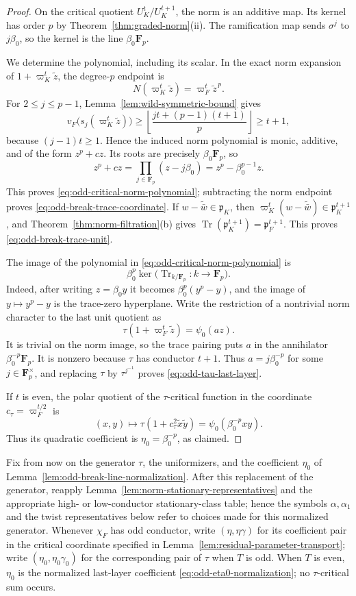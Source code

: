 \documentclass[11pt]{amsart}
\theoremstyle{definition}
\theoremstyle{remark}
\newcommand{\F}{\mathbf F}
\newcommand{\p}{\mathfrak p}
\newcommand{\Tr}{\operatorname{Tr}}
\begin{document}
\begin{proof}
On the critical quotient $U_K^t/U_K^{t+1}$, the norm is an additive
map.  Its kernel has order $p$ by
Theorem~\ref{thm:graded-norm}(ii).  The ramification map sends
$\sigma^j$ to $j\beta_0$, so the kernel is the line
$\beta_0\F_p$.

We determine the polynomial, including its scalar.  In the exact norm
expansion of $1+\varpi_K^t\widetilde z$, the degree-$p$ endpoint is
\[
 N(\varpi_K^t\widetilde z)=\varpi_F^t\widetilde z^{\,p}.
\]
For $2\le j\le p-1$, Lemma~\ref{lem:wild-symmetric-bound} gives
\[
 v_F\bigl(s_j(\varpi_K^t\widetilde z)\bigr)
 \ge
 \left\lfloor\frac{jt+(p-1)(t+1)}p\right\rfloor
 \ge t+1,
\]
because $(j-1)t\ge1$.  Hence the induced norm polynomial is monic,
additive, and of the form $z^p+cz$.  Its roots are precisely
$\beta_0\F_p$, so
\[
 z^p+cz=\prod_{j\in\F_p}(z-j\beta_0)
       =z^p-\beta_0^{p-1}z.
\]
This proves \eqref{eq:odd-critical-norm-polynomial}; subtracting the
norm endpoint proves \eqref{eq:odd-break-trace-coordinate}.
If $w-\widetilde{\bar w}\in\p_K$, then
$\varpi_K^t(w-\widetilde{\bar w})\in\p_K^{t+1}$, and
Theorem~\ref{thm:norm-filtration}(b) gives
$\Tr(\p_K^{t+1})=\p_F^{t+1}$.  This proves
\eqref{eq:odd-break-trace-unit}.

The image of the polynomial in
\eqref{eq:odd-critical-norm-polynomial} is
\[
 \beta_0^p\ker\bigl(\Tr_{k/\F_p}:k\to\F_p\bigr).
\]
Indeed, after writing $z=\beta_0y$ it becomes
$\beta_0^p(y^p-y)$, and the image of $y\mapsto y^p-y$ is the
trace-zero hyperplane.  Write the restriction of a nontrivial norm
character to the last unit quotient as
\[
 \tau(1+\varpi_F^t\widetilde z)=\psi_0(az).
\]
It is trivial on the norm image, so the trace pairing puts
$a$ in the annihilator
$\beta_0^{-p}\F_p$.  It is nonzero because $\tau$ has conductor
$t+1$.  Thus $a=j\beta_0^{-p}$ for some $j\in\F_p^\times$, and
replacing $\tau$ by $\tau^{j^{-1}}$ proves
\eqref{eq:odd-tau-last-layer}.

If $t$ is even, the polar quotient of the $\tau$-critical function in
the coordinate $c_\tau=\varpi_F^{t/2}$ is
\[
 (x,y)\longmapsto
 \tau(1+c_\tau^2\widetilde x\widetilde y)
 =\psi_0(\beta_0^{-p}xy).
\]
Thus its quadratic coefficient is $\eta_0=\beta_0^{-p}$, as claimed.
\end{proof}

Fix from now on the generator $\tau$, the uniformizers, and the
coefficient $\eta_0$ of Lemma~\ref{lem:odd-break-line-normalization}.
After this replacement of the generator, reapply
Lemma~\ref{lem:norm-stationary-representatives} and the appropriate
high- or low-conductor stationary-class table; hence the symbols
$\alpha,\alpha_1$ and the twist representatives below refer to choices
made for this normalized generator.  Whenever $\chi_F$ has odd
conductor, write
$(\eta,\eta\gamma)$ for its coefficient pair in the critical
coordinate specified in Lemma~\ref{lem:residual-parameter-transport}; write
$(\eta_0,\eta_0\gamma_0)$ for the corresponding pair of $\tau$ when
$T$ is odd.  When $T$ is even, $\eta_0$ is the normalized last-layer
coefficient \eqref{eq:odd-eta0-normalization}; no $\tau$-critical sum
occurs.
\end{document}
